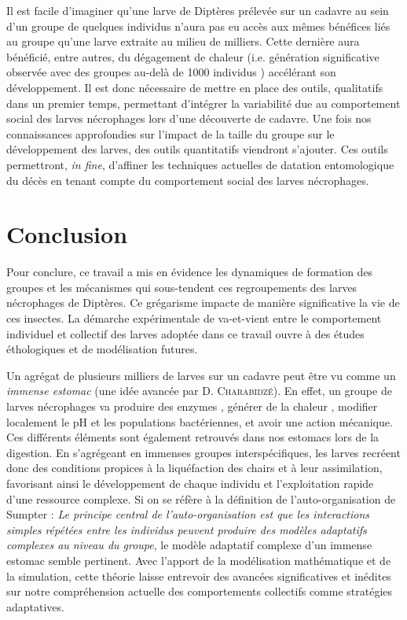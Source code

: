Il est facile d'imaginer qu'une larve de Diptères prélevée sur un cadavre au sein d'un groupe de quelques individus n'aura pas eu accès aux mêmes bénéfices liés au groupe qu'une larve extraite au milieu de milliers. Cette dernière aura bénéficié, entre autres, du dégagement de chaleur (i.e. génération significative observée avec des groupes au-delà de 1000 individus \cite{johnson_effect_2014}) accélérant son développement. Il est donc nécessaire de mettre en place des outils, qualitatifs dans un premier temps, permettant d'intégrer la variabilité due au comportement social des larves nécrophages lors d'une découverte de cadavre. Une fois nos connaissances approfondies sur l'impact de la taille du groupe sur le développement des larves, des outils quantitatifs viendront s'ajouter. Ces outils permettront, \textit{in fine}, d'affiner les techniques actuelles de datation entomologique du décès en tenant compte du comportement social des larves nécrophages.


    \section{Conclusion}    
    
Pour conclure, ce travail a mis en évidence les dynamiques de formation des groupes et les mécanismes qui sous-tendent ces regroupements des larves nécrophages de Diptères. Ce grégarisme impacte de manière significative la vie de ces insectes. La démarche expérimentale de va-et-vient entre le comportement individuel et collectif des larves adoptée dans ce travail ouvre à des études éthologiques et de modélisation futures. 

Un agrégat de plusieurs milliers de larves sur un cadavre peut être vu comme un \textit{immense estomac} (une idée avancée par D. \textsc{Charabidzé}). En effet, un groupe de larves nécrophages va produire des enzymes \cite{wilson_impacts_2015}, générer de la chaleur \cite{charabidze_larval-mass_2011}, modifier localement le pH et les populations bactériennes, et avoir une action mécanique. Ces différents éléments sont également retrouvés dans nos estomacs lors de la digestion. En s’agrégeant en immenses groupes interspécifiques, les larves recréent donc des conditions propices à la liquéfaction des chairs et à leur assimilation, favorisant ainsi le développement de chaque individu et l'exploitation rapide d'une ressource complexe. Si on se réfère à la définition de l'auto-organisation de Sumpter \cite{sumpter_collective_2009} : \textit{Le principe central de l'auto-organisation est que les interactions simples répétées entre les individus peuvent produire des modèles adaptatifs complexes au niveau du groupe}, le modèle adaptatif complexe d'un immense estomac semble pertinent. Avec l'apport de la modélisation mathématique et de la simulation, cette théorie laisse entrevoir des avancées significatives et inédites sur notre compréhension actuelle des comportements collectifs comme stratégies adaptatives.

\clearpage


        
        
        